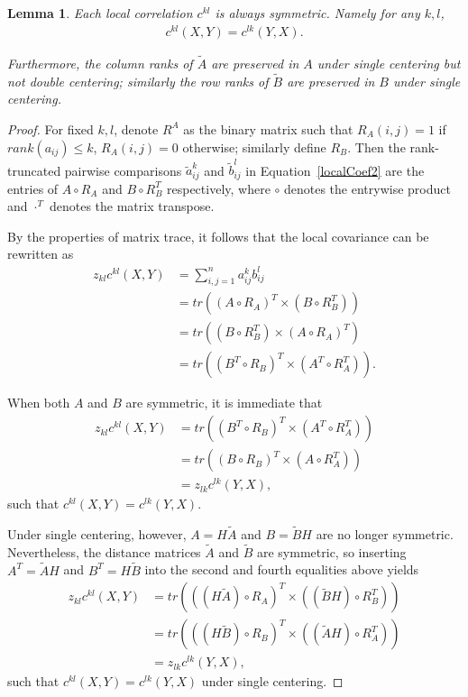 \documentclass[11pt]{article}
\providecommand{\mt}[1]{\widetilde{#1}}
\newcommand{\G}{c}
\newtheorem{appLem}{Lemma}
\begin{document}
\begin{appLem}
Each local correlation $\G^{kl}$ is always symmetric. Namely for any $k,l$, 
\begin{align*}
\G^{kl}(X,Y)=\G^{lk}(Y,X).
\end{align*}

Furthermore, the column ranks of $\tilde{A}$ are preserved in $A$ under single centering but not double centering; similarly the row ranks of $\tilde{B}$ are preserved in $B$ under single centering.
\end{appLem}
\begin{proof}
For fixed $k,l$, denote $R^{A}$ as the binary matrix such that $R_{A}(i,j)=1$ if $rank(a_{ij}) \leq k$, $R_{A}(i,j)=0$ otherwise; similarly define $R_{B}$. Then the rank-truncated pairwise comparisons $\mt{a}_{ij}^k$ and $\mt{b}_{ij}^l$ in Equation~\ref{localCoef2} are the entries of $A \circ R_{A}$ and $B \circ R_{B}^{T}$ respectively, where $\circ$ denotes the entrywise product and $\cdot^{T}$ denotes the matrix transpose.

By the properties of matrix trace, it follows that the local covariance can be rewritten as
\begin{align*}
z_{kl} \G^{kl}(X,Y) &= \textstyle \sum_{i,j=1}^n a_{ij}^k b_{ij}^l \\
 &= tr((A \circ R_{A})^{T} \times (B \circ R_{B}^{T})) \\
 &= tr((B \circ R_{B}^{T}) \times (A \circ R_{A})^{T}) \\
 &= tr((B^{T} \circ R_{B})^{T} \times (A^{T} \circ R_{A}^{T})).
\end{align*}

When both $A$ and $B$ are symmetric, it is immediate that
\begin{align*}
z_{kl} \G^{kl}(X,Y) &= tr((B^{T} \circ R_{B})^{T} \times (A^{T} \circ R_{A}^{T})) \\
 &= tr((B \circ R_{B})^{T} \times (A \circ R_{A}^{T})) \\
 &= z_{lk} \G^{lk}(Y,X),
\end{align*}
such that $\G^{kl}(X,Y)=\G^{lk}(Y,X)$.

Under single centering, however, $A=H \tilde{A}$ and $B=\tilde{B}H$ are no longer symmetric. Nevertheless, the distance matrices $\tilde{A}$ and $\tilde{B}$ are symmetric, so inserting $A^{T}=\tilde{A}H$ and $B^{T}=H\tilde{B}$ into the second and fourth equalities above yields
\begin{align*}
z_{kl} \G^{kl}(X,Y) &= tr(((H \tilde{A}) \circ R_{A})^{T} \times ((\tilde{B}H) \circ R_{B}^{T})) \\
 &= tr(((H \tilde{B}) \circ R_{B})^{T} \times ((\tilde{A}H) \circ R_{A}^{T})) \\
 &= z_{lk} \G^{lk}(Y,X),
\end{align*}
such that $\G^{kl}(X,Y)=\G^{lk}(Y,X)$ under single centering.


\end{proof}
\end{document}
